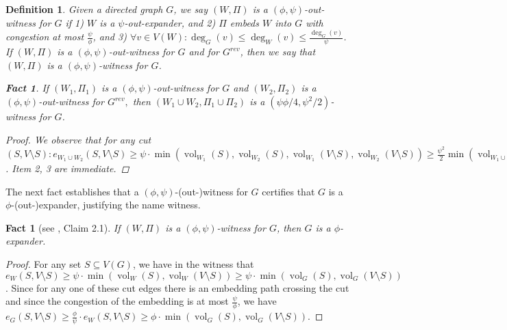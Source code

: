 \documentclass[11pt]{article}
\newtheorem{fact}[theorem]{Fact}
\newtheorem{definition}[theorem]{Definition}
\DeclareMathOperator{\vol}{vol}
\begin{document}
\begin{definition}\label{def:Witness}
    Given a directed graph $G$, we say $(W, \Pi)$ is a $(\phi, \psi)$-out-witness for $G$ if 1) $W$ is a $\psi$-out-expander, and 2) $\Pi$ embeds $W$ into $G$ with congestion at most $\frac{\psi}{\phi}$, and 3) $ \forall v \in V(W): \deg_{G}(v) \leq \deg_{W}(v) \leq \frac{\deg_G(v)}{\psi}$. If $(W, \Pi)$ is a $(\phi, \psi)$-out-witness for $G$ and for $G^{rev}$, then we say that $(W, \Pi)$ is a $(\phi, \psi)$-witness for $G$.

\begin{fact}
    If $(W_1, \Pi_1)$ is a $(\phi, \psi)$-out-witness for $G$ and $(W_2, \Pi_2)$ is a $(\phi, \psi)$-out-witness for $G^{rev},$ then $(W_1 \cup W_2, \Pi_1 \cup \Pi_2)$ is a $(\psi\phi/4, \psi^2/2)$-witness for $G$.
\end{fact}

\begin{proof}
    We observe that for any cut $(S, V\setminus S): e_{W_1 \cup W_2}(S,V \setminus S) \geq \psi \cdot \min(\vol_{W_1}(S), \vol_{W_2}(S), \vol_{W_1}(V \setminus S), \vol_{W_2}(V \setminus S)) \geq \frac{\psi^2}{2} \min(\vol_{W_1 \cup W_2}(S), \vol_{W_1 \cup W_2}(V \setminus S))$.  Item 2, 3 are immediate.
\end{proof}

\end{definition}

The next fact establishes that a $(\phi, \psi)$-(out-)witness for $G$ certifies that $G$ is a $\phi$-(out-)expander, justifying the name witness.

\begin{fact}[see \cite{hua2023maintaining}, Claim 2.1]\label{fact}
If $(W, \Pi)$ is a $(\phi,\psi)$-witness for $G$, then $G$ is a $\phi$-expander.
\end{fact}

\begin{proof}
    For any set $S \subseteq V(G)$, we have in the witness that $e_W(S, V \setminus S) \geq \psi \cdot \min(\vol_W(S) , \vol_W(V \setminus S)) \geq \psi \cdot \min(\vol_G(S) , \vol_G(V \setminus S))$. Since for any one of these cut edges there is an embedding path crossing the cut and since the congestion of the embedding is at most $\frac{\psi}{\phi}$, we have $e_G(S, V \setminus S) \geq \frac{\phi}{\psi} \cdot e_W(S, V \setminus S) \geq \phi \cdot \min(\vol_G(S) , \vol_G(V \setminus S)).$
\end{proof}
\end{document}
